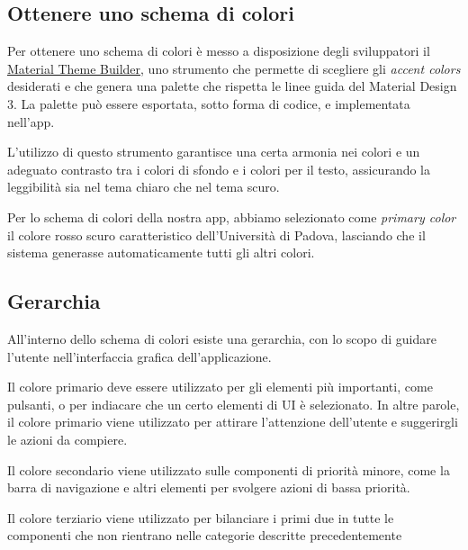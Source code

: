 \documentclass[12pt, a4paper]{report}
\begin{document}
		\subsection{Ottenere uno schema di colori}
		Per ottenere uno schema di colori è messo a disposizione degli sviluppatori il \href{https://material-foundation.github.io/material-theme-builder/#/custom}{Material Theme Builder}, uno strumento che permette di scegliere gli \textit{accent colors} desiderati e che genera una palette che rispetta le linee guida del Material Design 3. La palette può essere esportata, sotto forma di codice, e implementata nell'app.
		
		L'utilizzo di questo strumento garantisce una certa armonia nei colori e un adeguato contrasto tra i colori di sfondo e i colori per il testo, assicurando la leggibilità sia nel tema chiaro che nel tema scuro.
		
		Per lo schema di colori della nostra app, abbiamo selezionato come \textit{primary color} il colore rosso scuro caratteristico dell'Università di Padova, lasciando che il sistema generasse automaticamente tutti gli altri colori.
		
		\subsection{Gerarchia}
		All'interno dello schema di colori esiste una gerarchia, con lo scopo di guidare l'utente nell'interfaccia grafica dell'applicazione. 
		
		Il colore primario deve essere utilizzato per gli elementi più importanti, come pulsanti, o per indiacare che un certo elementi di UI è selezionato. In altre parole, il colore primario viene utilizzato per attirare l'attenzione dell'utente e suggerirgli le azioni da compiere.
		
		Il colore secondario viene utilizzato sulle componenti di priorità minore, come la barra di navigazione e altri elementi per svolgere azioni di bassa priorità.
		
		Il colore terziario viene utilizzato per bilanciare i primi due in tutte le componenti che non rientrano nelle categorie descritte precedentemente
		
\end{document}
